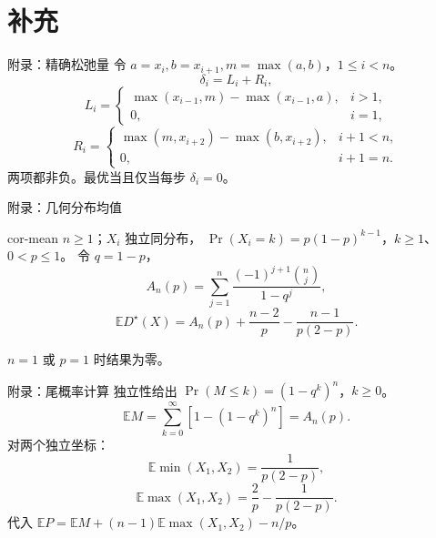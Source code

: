 \documentclass{beamer}
\begin{document}
\section{补充}
\begin{frame}{附录：精确松弛量}
令 $a=x_i,b=x_{i+1},m=\max(a,b)$，$1\leq i<n$。
\[
\delta_i=L_i+R_i,
\]
\[
L_i=\begin{cases}\max(x_{i-1},m)-\max(x_{i-1},a),&i>1,\\0,&i=1,\end{cases}
\]
\[
R_i=\begin{cases}\max(m,x_{i+2})-\max(b,x_{i+2}),&i+1<n,\\0,&i+1=n.\end{cases}
\]
两项都非负。最优当且仅当每步 $\delta_i=0$。
\end{frame}
\begin{frame}{附录：几何分布均值}
\begin{bookresult}{cor-mean}
$n\geq1$；$X_i$ 独立同分布，
$\Pr(X_i=k)=p(1-p)^{k-1}$，$k\geq1$、$0<p\leq1$。
令 $q=1-p$，
\[
A_n(p)=\sum_{j=1}^{n}\frac{(-1)^{j+1}\binom nj}{1-q^j},
\]
\[
\mathbb E D^{\star}(X)=A_n(p)+\frac{n-2}{p}-\frac{n-1}{p(2-p)}.
\]
\end{bookresult}
$n=1$ 或 $p=1$ 时结果为零。
\end{frame}
\begin{frame}{附录：尾概率计算}
独立性给出 $\Pr(M\leq k)=(1-q^k)^n$，$k\geq0$。
\[
\mathbb E M=\sum_{k=0}^{\infty}[1-(1-q^k)^n]=A_n(p).
\]
对两个独立坐标：
\[
\mathbb E\min(X_1,X_2)=\frac{1}{p(2-p)},
\]
\[
\mathbb E\max(X_1,X_2)=\frac{2}{p}-\frac{1}{p(2-p)}.
\]
代入 $\mathbb E P=\mathbb E M+(n-1)\mathbb E\max(X_1,X_2)-n/p$。
\end{frame}
\FormalVerification
\end{document}
